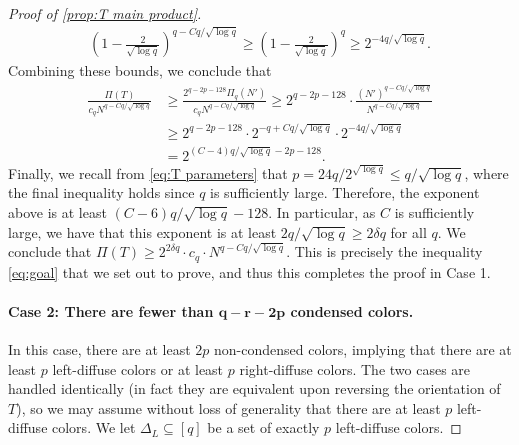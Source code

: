 \documentclass[11pt,reqno]{amsart}
\theoremstyle{definition}
\newcommand\1{\mathbf{1}}
\let\leq\leqslant
\let\geq\geqslant
\begin{document}
\begin{proof}[Proof of \cref{prop:T main product}]
    \begin{align*}
        \left( 1-\frac{2}{{\sqrt{\log q}}} \right)^{q-Cq/\sqrt{\log q}} \geq\left( 1-\frac{2}{{\sqrt{\log q}}} \right)^q \geq 2^{-4q/\sqrt{\log q}}.
    \end{align*}
    Combining these bounds, we conclude that
    \begin{align*}
        \frac{\Pi(T)}{c_q N^{q-Cq/\sqrt{\log q}}} &\geq \frac{2^{q-2p-128} \Pi_q(N')}{c_q N^{q-Cq/\sqrt{\log q}}}\geq 2^{q-2p-128} \cdot \frac{(N')^{q-Cq/\sqrt{\log q}}}{N^{q-Cq/\sqrt{\log q}}}\\
        &\geq 2^{q-2p-128} \cdot 2^{-q+Cq/\sqrt{\log q}} \cdot 2^{-4q/\sqrt{\log q}}\\
        &= 2^{(C-4)q/\sqrt{\log q} -2p -128}.
    \end{align*}
    Finally, we recall from \eqref{eq:T parameters} that $p = 24q/2^{\sqrt{\log q}} \leq q/\sqrt{\log q}$, where the final inequality holds since $q$ is sufficiently large. Therefore, the exponent above is at least $(C-6)q/\sqrt{\log q}-128$. In particular, as $C$ is sufficiently large, we have that this exponent is at least $2q/{\sqrt{\log q}}\geq 2\delta q$ for all $q$. We conclude that $\Pi(T) \geq 2^{2\delta q}\cdot c_q\cdot N^{q-Cq/\sqrt{\log q}}$. 
    This is precisely the inequality \eqref{eq:goal} that we set out to prove, and thus this completes the proof in Case 1.

    \paragraph{\bf Case 2: There are fewer than $\bm{q-r-2p}$ condensed colors.} In this case, there are at least $2p$ non-condensed colors, implying that there are at least $p$ left-diffuse colors or at least $p$ right-diffuse colors. The two cases are handled identically (in fact they are equivalent upon reversing the orientation of $T$), so we may assume without loss of generality that there are at least $p$ left-diffuse colors. We let $\Delta_L\subseteq [q]$ be a set of exactly $p$ left-diffuse colors.


\end{proof}
\end{document}
